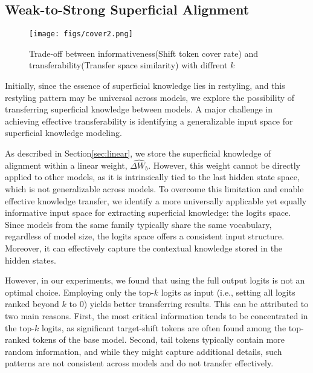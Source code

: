\subsection{Weak-to-Strong Superficial Alignment}\label{sec:transfer}





\begin{figure}[h]
\centering
  \texttt{[image: figs/cover2.png]}
  \caption{Trade-off between informativeness(Shift token cover rate) and transferability(Transfer space similarity) with diffrent $k$}
  \label{fig:cover}
  \vspace{-0.2in}
\end{figure}

Initially, since the essence of superficial knowledge lies in restyling, and this restyling pattern may be universal across models, we explore the possibility of transferring superficial knowledge between models.
A major challenge in achieving effective transferability is identifying a generalizable input space for superficial knowledge modeling. 

As described in Section\ref{sec:linear}, we store the superficial knowledge of alignment within a linear weight, $\widehat{\Delta W_b}$. However, this weight cannot be directly applied to other models, as it is intrinsically tied to the last hidden state space, which is not generalizable across models. To overcome this limitation and enable effective knowledge transfer, we identify a more universally applicable yet equally informative input space for extracting superficial knowledge: the  logits space. Since models from the same family typically share the same vocabulary, regardless of model size, the logits space offers a consistent input structure. Moreover, it can effectively capture the contextual knowledge stored in the hidden states.

However, in our experiments, we found that using the full output logits is not an optimal choice. Employing only the top-$k$ logits as input (i.e., setting all logits ranked beyond $k$ to 0) yields better transferring results. This can be attributed to two main reasons. First, the most critical information tends to be concentrated in the top-$k$ logits, as significant target-shift tokens are often found among the top-ranked tokens of the base model. Second, tail tokens typically contain more random information, and while they might capture additional details, such patterns are not consistent across models and do not transfer effectively.


